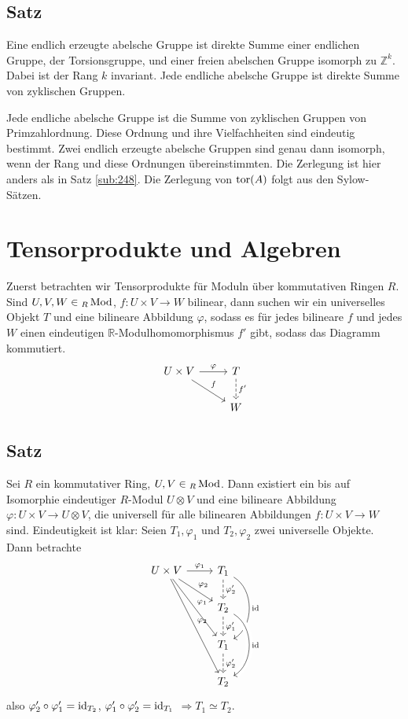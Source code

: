 \subsection[Satz: Umformulierung des Struktursatzes für endl. erzeugte abelsche Gruppen]{Satz} %
\label{sub:253}
Eine endlich erzeugte abelsche Gruppe ist direkte Summe einer endlichen Gruppe, der Torsionsgruppe, und einer freien abelschen Gruppe isomorph zu $\mathds{Z}^k$. Dabei ist 
der Rang $k$ invariant. Jede endliche abelsche Gruppe ist direkte Summe von zyklischen Gruppen.

Jede endliche abelsche Gruppe ist die Summe von zyklischen Gruppen von Primzahlordnung. Diese Ordnung und ihre Vielfachheiten sind eindeutig bestimmt. Zwei endlich erzeugte
abelsche Gruppen sind genau dann isomorph, wenn der Rang und diese Ordnungen übereinstimmten.
Die Zerlegung ist hier anders als in Satz \ref{sub:248}. Die Zerlegung von $\operatorname{tor}(A)$ folgt aus den Sylow-Sätzen.
\newpage

\section{Tensorprodukte und Algebren} %
\label{sec:3}
Zuerst betrachten wir Tensorprodukte für Moduln über kommutativen Ringen $R$. Sind $U,V, W \in {_R \operatorname{Mod}}$, $f : U \times V \to W$ bilinear, dann suchen wir ein 
universelles Objekt $T$ und eine bilineare Abbildung $\varphi$, sodass es für jedes bilineare $f$ und jedes $W$ einen eindeutigen $\mathds{R}$-Modulhomomorphismus $f'$ 
gibt, sodass das Diagramm kommutiert.
\[
	\begin{tikzcd}
		U \times V \rar{\varphi} \drar{f} & T \dar[dashed]{f'}\\
		& W
	\end{tikzcd}
\]
\subsection[Satz: Universelle Eigenschaft des Tensorproduktes]{Satz} %
\label{sub:31}
Sei $R$ ein kommutativer Ring, $U,V \in {_R \operatorname{Mod}}$. Dann existiert ein bis auf Isomorphie eindeutiger $R$-Modul $U \otimes V$ und eine bilineare Abbildung 
$\varphi : U \times V \to U \otimes V$, die universell für alle bilinearen Abbildungen $f : U \times V \to W$ sind.
Eindeutigkeit ist klar: Seien $T_1, \varphi_1$ und $T_2, \varphi_2$ zwei universelle Objekte. Dann betrachte
\[
	\begin{tikzcd}
		U \times V \rar{\varphi_1} \drar{\varphi_2} \arrow{ddr}{\varphi_1} \arrow{dddr}{\varphi_2}& T_1  \dar[dashed]{\varphi_2'} \arrow[bend left = 60]{dd}{\id}	\\
		& T_2 \dar[dashed]{\varphi_1'}  \arrow[bend left = 60, crossing over]{dd}{\id}\\
		& T_1 \dar[dashed]{\varphi_2'} \\
		& T_2
	\end{tikzcd}
\]
also $\varphi_2' \circ \varphi_1' = \operatorname{id}_{T_2}$, $\varphi_1' \circ \varphi_2' = \operatorname{id}_{T_1}$ $\Rightarrow T_1 \simeq T_2$.

